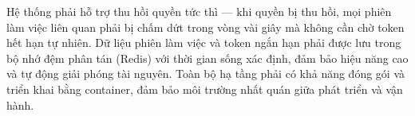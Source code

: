 \documentclass[../DoAn.tex]{subfiles}
\begin{document}
Hệ thống phải hỗ trợ thu hồi quyền tức thì — khi quyền bị thu hồi, mọi phiên làm việc liên quan phải bị chấm dứt trong vòng vài giây mà không cần chờ token hết hạn tự nhiên. Dữ liệu phiên làm việc và token ngắn hạn phải được lưu trong bộ nhớ đệm phân tán (Redis) với thời gian sống xác định, đảm bảo hiệu năng cao và tự động giải phóng tài nguyên. Toàn bộ hạ tầng phải có khả năng đóng gói và triển khai bằng container, đảm bảo môi trường nhất quán giữa phát triển và vận hành.


\end{document}
